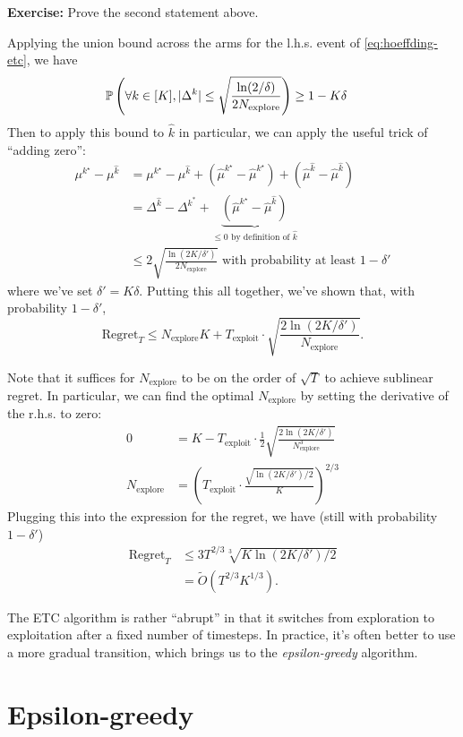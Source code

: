 \documentclass[\main/main]{subfiles}
\newcommand{\Nex}{N_{\text{explore}}}
\begin{document}
\textbf{Exercise:} Prove the second statement above.

Applying the union bound across the arms for the l.h.s. event of \ref*{eq:hoeffding-etc}, we have
\begin{align*}
    \P\left( \forall k \in [K], |\Delta^k | \le \sqrt{\frac{\ln(2/\delta)}{2\Nex}} \right) &\ge 1-K\delta
\end{align*}
Then to apply this bound to $\hat k$ in particular, we can apply the useful trick of ``adding zero'':
\begin{align*}
    \mu^{k^\star} - \mu^{\hat k} &= \mu^{k^\star} - \mu^{\hat k} + (\hat \mu^{k^\star} - \hat \mu^{k^\star}) + (\hat \mu^{\hat k} - \hat \mu^{\hat k}) \\
    &= \Delta^{\hat k} - \Delta^{k^*} + \underbrace{(\hat \mu^{k^\star} - \hat \mu^{\hat k})}_{\le 0 \text{ by definition of } \hat k} \\
    &\le 2 \sqrt{\frac{\ln(2K/\delta')}{2\Nex}} \text{ with probability at least } 1-\delta'
\end{align*}
where we've set $\delta' = K\delta$.
Putting this all together, we've shown that, with probability $1 - \delta'$,
\[
    \text{Regret}_T \le \Nex K + T_{\text{exploit}} \cdot \sqrt{\frac{2\ln(2K/\delta')}{\Nex}}.
\]

Note that it suffices for $\Nex$ to be on the order of $\sqrt{T}$ to achieve sublinear regret. In particular, we can find the optimal $\Nex$ by setting the derivative of the r.h.s. to zero:
\begin{align*}
    0 &= K - T_{\text{exploit}} \cdot \frac{1}{2} \sqrt{\frac{2\ln(2K/\delta')}{\Nex^3}} \\
    \Nex &= \left( T_{\text{exploit}} \cdot \frac{\sqrt{\ln(2K/\delta')/2}}{K} \right)^{2/3}
\end{align*}
Plugging this into the expression for the regret, we have (still with probability $1-\delta'$)
\begin{align*}
    \text{Regret}_T &\le 3 T^{2/3} \sqrt[3]{K \ln(2K/\delta') / 2} \\
    &= \tilde{O}(T^{2/3} K^{1/3}).
\end{align*}

The ETC algorithm is rather ``abrupt'' in that it switches from exploration to exploitation after a fixed number of timesteps. In practice, it's often better to use a more gradual transition, which brings us to the \emph{epsilon-greedy} algorithm.

\section{Epsilon-greedy}
\end{document}
